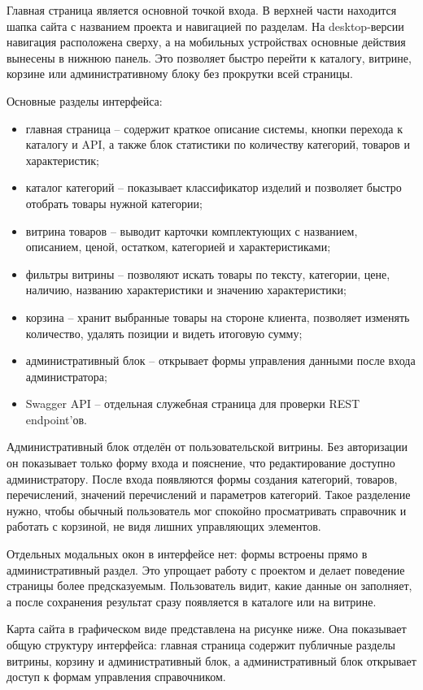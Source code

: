 \documentclass[a4paper,14pt]{extarticle}
\begin{document}
Главная страница является основной точкой входа. В верхней части находится шапка сайта с названием проекта и навигацией по разделам. На desktop-версии навигация расположена сверху, а на мобильных устройствах основные действия вынесены в нижнюю панель. Это позволяет быстро перейти к каталогу, витрине, корзине или административному блоку без прокрутки всей страницы.

Основные разделы интерфейса:
\begin{itemize}
    \item главная страница -- содержит краткое описание системы, кнопки перехода к каталогу и API, а также блок статистики по количеству категорий, товаров и характеристик;
    \item каталог категорий -- показывает классификатор изделий и позволяет быстро отобрать товары нужной категории;
    \item витрина товаров -- выводит карточки комплектующих с названием, описанием, ценой, остатком, категорией и характеристиками;
    \item фильтры витрины -- позволяют искать товары по тексту, категории, цене, наличию, названию характеристики и значению характеристики;
    \item корзина -- хранит выбранные товары на стороне клиента, позволяет изменять количество, удалять позиции и видеть итоговую сумму;
    \item административный блок -- открывает формы управления данными после входа администратора;
    \item Swagger API -- отдельная служебная страница для проверки REST endpoint'ов.
\end{itemize}

Административный блок отделён от пользовательской витрины. Без авторизации он показывает только форму входа и пояснение, что редактирование доступно администратору. После входа появляются формы создания категорий, товаров, перечислений, значений перечислений и параметров категорий. Такое разделение нужно, чтобы обычный пользователь мог спокойно просматривать справочник и работать с корзиной, не видя лишних управляющих элементов.

Отдельных модальных окон в интерфейсе нет: формы встроены прямо в административный раздел. Это упрощает работу с проектом и делает поведение страницы более предсказуемым. Пользователь видит, какие данные он заполняет, а после сохранения результат сразу появляется в каталоге или на витрине.

Карта сайта в графическом виде представлена на рисунке ниже. Она показывает общую структуру интерфейса: главная страница содержит публичные разделы витрины, корзину и административный блок, а административный блок открывает доступ к формам управления справочником.
\end{document}

